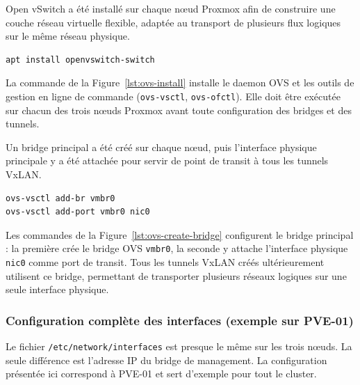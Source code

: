 \par Open vSwitch a été installé sur chaque nœud Proxmox afin de construire une couche réseau virtuelle flexible, adaptée au transport de plusieurs flux logiques sur le même réseau physique.\\

\begin{lstlisting}[style=sonacode,language=bash,caption={Installation d'Open vSwitch},label={lst:ovs-install}]
apt install openvswitch-switch
\end{lstlisting}

\par La commande de la Figure~\ref{lst:ovs-install} installe le daemon OVS et les outils de gestion en ligne de commande (\texttt{ovs-vsctl}, \texttt{ovs-ofctl}). Elle doit être exécutée sur chacun des trois nœuds Proxmox avant toute configuration des bridges et des tunnels.\\

\par Un bridge principal a été créé sur chaque nœud, puis l'interface physique principale y a été attachée pour servir de point de transit à tous les tunnels VxLAN.\\

\begin{lstlisting}[style=sonacode,language=bash,caption={Création du bridge OVS principal},label={lst:ovs-create-bridge}]
ovs-vsctl add-br vmbr0
ovs-vsctl add-port vmbr0 nic0
\end{lstlisting}

\par Les commandes de la Figure~\ref{lst:ovs-create-bridge} configurent le bridge principal : la première crée le bridge OVS \texttt{vmbr0}, la seconde y attache l'interface physique \texttt{nic0} comme port de transit. Tous les tunnels VxLAN créés ultérieurement utilisent ce bridge, permettant de transporter plusieurs réseaux logiques sur une seule interface physique.\\

\subsubsection{Configuration complète des interfaces (exemple sur PVE-01)}

\par Le fichier \texttt{/etc/network/interfaces} est presque le même sur les trois nœuds. La seule différence est l'adresse IP du bridge de management. La configuration présentée ici correspond à PVE-01 et sert d'exemple pour tout le cluster. \\

